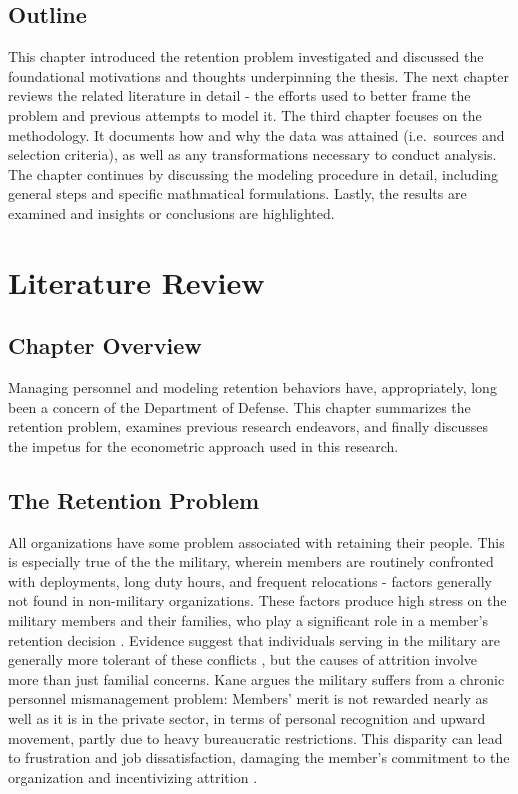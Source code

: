 \documentclass[12pt,letterpaper,toc=flat,oneside]{report}
\theoremstyle{definition}
\theoremstyle{definition}
\theoremstyle{definition}
\theoremstyle{remark}
\begin{document}
\hypertarget{outline}{%
\section{Outline}\label{outline}}

This chapter introduced the retention problem investigated and discussed
the foundational motivations and thoughts underpinning the thesis. The
next chapter reviews the related literature in detail - the efforts used
to better frame the problem and previous attempts to model it. The third
chapter focuses on the methodology. It documents how and why the data
was attained (i.e.~sources and selection criteria), as well as any
transformations necessary to conduct analysis. The chapter continues by
discussing the modeling procedure in detail, including general steps and
specific mathmatical formulations. Lastly, the results are examined and
insights or conclusions are highlighted.

\newpage

\hypertarget{literature-review}{%
\chapter{Literature Review}\label{literature-review}}

\hypertarget{chapter-overview}{%
\section{Chapter Overview}\label{chapter-overview}}

Managing personnel and modeling retention behaviors have, appropriately,
long been a concern of the Department of Defense. This chapter
summarizes the retention problem, examines previous research endeavors,
and finally discusses the impetus for the econometric approach used in
this research.

\hypertarget{the-retention-problem}{%
\section{The Retention Problem}\label{the-retention-problem}}

All organizations have some problem associated with retaining their
people. This is especially true of the the military, wherein members are
routinely confronted with deployments, long duty hours, and frequent
relocations - factors generally not found in non-military organizations.
These factors produce high stress on the military members and their
families, who play a significant role in a member's retention decision
\cite{fugita-lakhani-1991}. Evidence suggest that individuals serving in
the military are generally more tolerant of these conflicts
\cite{capon-etal-2007}, but the causes of attrition involve more than
just familial concerns. Kane \cite{kane-2012} argues the military
suffers from a chronic personnel mismanagement problem: Members' merit
is not rewarded nearly as well as it is in the private sector, in terms
of personal recognition and upward movement, partly due to heavy
bureaucratic restrictions. This disparity can lead to frustration and
job dissatisfaction, damaging the member's commitment to the
organization and incentivizing attrition \cite{capon-etal-2007}.
\end{document}
